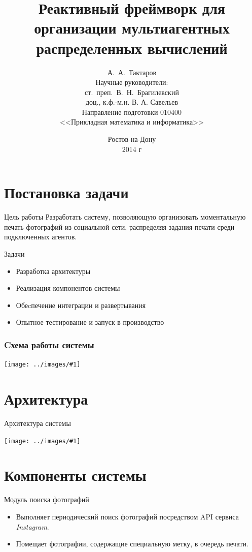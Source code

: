 \documentclass[utf-8]{beamer}
\title[Организация мультиагентных распределенных вычислений]{Реактивный фреймворк для организации мультиагентных распределенных вычислений}
\author[Тактаров~А.~А.]
{
  А.~А.~Тактаров \\[0.5cm]
  Научные руководители: \\
  ст.~преп.~В.~Н.~Брагилевский\\
  доц., к.ф.-м.н. В. А. Савельев\\[0.5cm]
  \small{Направление подготовки 010400 \\ <<Прикладная математика и информатика>>}
}
\date{ {\footnotesize Ростов-на-Дону \\ 2014 г} }
\newcommand{\slidegraphics}[1]{
\begin{center}
 \texttt{[image: ../images/\#1]}
\end{center}}
\begin{document}
\begin{frame}
  \titlepage
\end{frame}

\section{Постановка задачи}
\begin{frame}
  \begin{block}{Цель работы}
    Разработать систему, позволяющую организовать моментальную печать фотографий из социальной сети, распределяя
    задания печати среди подключенных агентов.
  \end{block}

  \begin{block}{Задачи}
    \begin{itemize}
      \item Разработка архитектуры
      \item Реализация компонентов системы
      \item Обеcпечение интеграции и развертывания
      \item Опытное тестирование и запуск в производство
    \end{itemize}
  \end{block}
\end{frame}

\begin{frame}
  \frametitle{Cхема работы системы}
  \slidegraphics{print-schema.pdf}
\end{frame}

\section{Архитектура}
\begin{frame}{Архитектура системы}
  \slidegraphics{architecture-simple.pdf}
\end{frame}

\section{Компоненты системы}
\begin{frame}{Модуль поиска фотографий}
  \begin{itemize}
    \item Выполняет периодический поиск фотографий посредством API сервиса \textit{Instagram}.\\[0.5cm]

    \item Помещает фотографии, содержащие специальную метку, в очередь печати.
  \end{itemize}
\end{frame}
\end{document}
